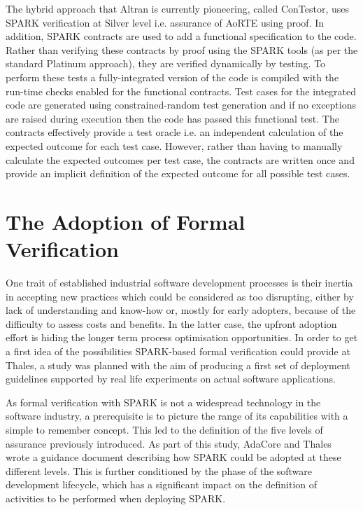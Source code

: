 \documentclass{llncs}
\begin{document}
The hybrid approach that Altran is currently pioneering, called ConTestor, uses
SPARK verification at Silver level i.e. assurance of AoRTE using proof. In
addition, SPARK contracts are used to add a functional specification to the
code. Rather than verifying these contracts by proof using the SPARK tools (as
per the standard Platinum approach), they are verified dynamically by
testing. To perform these tests a fully-integrated version of the code is
compiled with the run-time checks enabled for the functional contracts. Test
cases for the integrated code are generated using constrained-random test
generation and if no exceptions are raised during execution then the code has
passed this functional test. The contracts effectively provide a test oracle
i.e. an independent calculation of the expected outcome for each test
case. However, rather than having to manually calculate the expected outcomes
per test case, the contracts are written once and provide an implicit
definition of the expected outcome for all possible test cases.

\section{The Adoption of Formal Verification}

One trait of established industrial software development processes is their
inertia in accepting new practices which could be considered as too disrupting,
either by lack of understanding and know-how or, mostly for early adopters,
because of the difficulty to assess costs and benefits. In the latter case, the
upfront adoption effort is hiding the longer term process optimisation
opportunities. In order to get a first idea of the possibilities SPARK-based
formal verification could provide at Thales, a study was planned with the aim
of producing a first set of deployment guidelines supported by real life
experiments on actual software applications.

As formal verification with SPARK is not a widespread technology in the
software industry, a prerequisite is to picture the range of its capabilities
with a simple to remember concept. This led to the definition of the five
levels of assurance previously introduced. As part of this study, AdaCore and
Thales wrote a guidance document describing how SPARK could be adopted at these
different levels. This is further conditioned by the phase of the software
development lifecycle, which has a significant impact on the definition of
activities to be performed when deploying SPARK.
\end{document}
